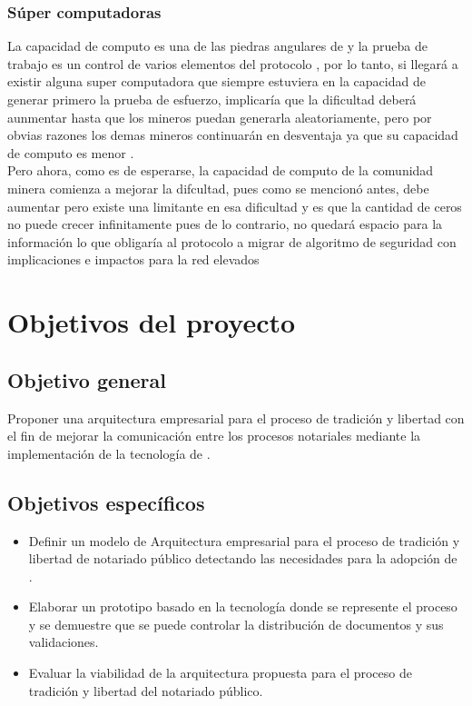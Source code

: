 \subsubsection{Súper computadoras}
La capacidad de computo es una de las piedras angulares de \blckchn y la prueba de trabajo es un control de varios elementos del protocolo \blckchn, por lo tanto, si llegará a existir alguna super computadora que siempre estuviera en la capacidad de generar primero la prueba de esfuerzo, implicaría que la dificultad deberá aunmentar hasta que los mineros puedan generarla aleatoriamente, pero por obvias razones los demas mineros continuarán en desventaja ya que su capacidad de computo es menor \citep{nakamoto2009bitcoin}.
\\
Pero ahora, como es de esperarse, la capacidad de computo de la comunidad minera comienza a mejorar la difcultad, pues como se mencionó antes, debe aumentar pero existe una limitante en esa dificultad y es que la cantidad de ceros no puede crecer infinitamente pues de lo contrario, no quedará espacio para la información lo que obligaría al protocolo a migrar de algoritmo de seguridad con implicaciones e impactos para la red elevados\citep{crosby2016blockchain}


\section{Objetivos del proyecto}

\subsection{Objetivo general}
Proponer una arquitectura empresarial para el proceso de tradición y libertad con el fin de mejorar la comunicación entre los procesos notariales mediante la implementación de la tecnología de \blckchn. 

\subsection{Objetivos específicos}
\begin{itemize}

\item Definir un modelo de Arquitectura empresarial para el proceso de tradición y libertad de notariado público detectando las necesidades para la adopción de \blckchn.

\item Elaborar un prototipo basado en la tecnología \blckchn donde se represente el proceso y se demuestre que se puede controlar la distribución de documentos y sus validaciones.

\item Evaluar la viabilidad de la arquitectura propuesta para el proceso de tradición y libertad del notariado público.
\end{itemize}

